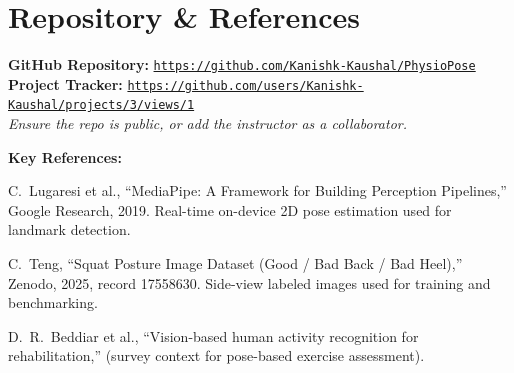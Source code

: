 \documentclass[11pt, letterpaper]{article}
\newcommand{\placeholder}[1]{\textcolor{placeholder}{\textit{#1}}}
\begin{document}
\section{Repository \& References}
\begin{tcolorbox}[sectionbox, height=4.2cm, valign=top]
  \textbf{GitHub Repository:}
  \href{https://github.com/Kanishk-Kaushal/PhysioPose}%
       {\texttt{https://github.com/Kanishk-Kaushal/PhysioPose}}\\[2pt]
  \textbf{Project Tracker:}
  \href{https://github.com/users/Kanishk-Kaushal/projects/3/views/1}%
       {\texttt{https://github.com/users/Kanishk-Kaushal/projects/3/views/1}}\\[2pt]
  \placeholder{Ensure the repo is public, or add the instructor as a collaborator.}

  \vspace{6pt}
  \textbf{Key References:}
  \begin{enumerate}[leftmargin=1.4em, itemsep=1pt, topsep=2pt, label={[\arabic*]}]
    \item C.\ Lugaresi et al., ``MediaPipe: A Framework for Building Perception
      Pipelines,'' Google Research, 2019. Real-time on-device 2D pose
      estimation used for landmark detection.
    \item C.\ Teng, ``Squat Posture Image Dataset (Good / Bad Back / Bad
      Heel),'' Zenodo, 2025, record 17558630. Side-view labeled images used for
      training and benchmarking.
    \item D.\ R.\ Beddiar et al., ``Vision-based human activity recognition for
      rehabilitation,'' (survey context for pose-based exercise assessment).
  \end{enumerate}
\end{tcolorbox}
\end{document}
